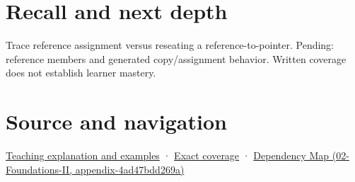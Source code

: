 \section{Recall and next depth}\label{appendix-d6d562ca9fbb-recall-and-next-depth}

Trace reference assignment versus reseating a reference-to-pointer. Pending: reference members and generated copy/assignment behavior. Written coverage does not establish learner mastery.

\section{Source and navigation}\label{appendix-d6d562ca9fbb-source-and-navigation}

\href{Continuous\%20Notes/Computing\%20Foundations\%20-\%20From\%20Bits\%20to\%20C++\%20and\%20Systems\%20APIs\#Giving\%20another\%20name\%20to\%20a\%20live\%20object}{Teaching explanation and examples} · \hyperref[appendix-fd090d982a15-m008---parts-113-126]{Exact coverage} · \href{../02-Foundations-II/main.pdf\#nameddest=appendix-4ad47bdd269a}{Dependency Map (02-Foundations-II, appendix-4ad47bdd269a)}
